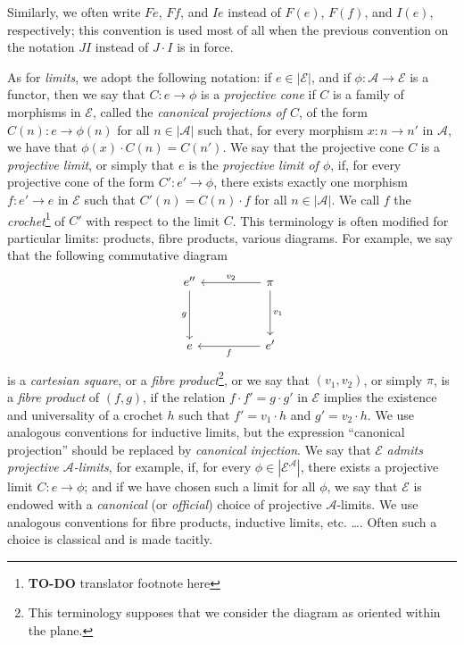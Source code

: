\documentclass[fleqn]{article}
\newcommand{\oldpage}[1]{\marginpar{\footnotesize$\Big\vert$ \textit{p.~#1}}}
\newcommand{\todo}{{\color{purple}\textbf{TO-DO }}}
\newcommand{\cat}[1]{\mathcal{#1}}
\newcommand{\set}[1]{|#1|}
\begin{document}
Similarly, we often write $Fe$, $Ff$, and $Ie$ instead of $F(e)$, $F(f)$, and $I(e)$, respectively; this convention is used most of all when the previous convention on the notation $JI$ instead of $J\cdot I$ is in force.

As for \emph{limits}, we adopt the following notation: if $e\in\set{\cat{E}}$, and if $\phi\colon \cat{A}\to\cat{E}$ is a functor, then we say that $C\colon e\to\phi$ is a \emph{projective cone} if $C$ is a family of morphisms in $\cat{E}$, called the \emph{canonical projections of $C$}, of the form $C(n)\colon e\to\phi(n)$ for all $n\in\set{\cat{A}}$ such that, for every morphism $x\colon n\to n'$ in $\cat{A}$, we have that $\phi(x)\cdot C(n)=C(n')$.
We say that the projective cone $C$ is a \emph{projective limit}, or simply that $e$ is the \emph{projective limit of $\phi$}, if, for every projective cone of the form $C'\colon e'\to\phi$, there exists exactly one morphism $f\colon e'\to e$ in $\cat{E}$ such that $C'(n)=C(n)\cdot f$ for all $n\in\set{\cat{A}}$.
We call $f$ the \emph{crochet}\footnote{\todo{translator footnote here}} of $C'$ with respect to the limit $C$.
This terminology is often modified for particular limits: products, fibre products, various diagrams.
For example, we say that the following commutative diagram
\oldpage{222}
\[
  \begin{tikzcd}[sep=huge]
    e'' \ar[d,swap,"g"]
  & \pi \ar[l,swap,"v_2"] \ar[d,"v_1"]
  \\e
  & e' \ar[l,"f"]
  \end{tikzcd}
\]
is a \emph{cartesian square}, or a \emph{fibre product}\footnote{This terminology supposes that we consider the diagram as oriented within the plane.}, or we say that $(v_1,v_2)$, or simply $\pi$, is a \emph{fibre product} of $(f,g)$, if the relation $f\cdot f'=g\cdot g'$ in $\cat{E}$ implies the existence and universality of a crochet $h$ such that $f'=v_1\cdot h$ and $g'=v_2\cdot h$.
We use analogous conventions for inductive limits, but the expression ``canonical projection''  should be replaced by \emph{canonical injection}.
We say that $\cat{E}$ \emph{admits projective $\cat{A}$-limits}, for example, if, for every $\phi\in\set{\cat{E}^\cat{A}}$, there exists a projective limit $C\colon e\to\phi$;
and if we have chosen such a limit for all $\phi$, we say that $\cat{E}$ is endowed with a \emph{canonical} (or \emph{official}) choice of projective $\cat{A}$-limits.
We use analogous conventions for fibre products, inductive limits, etc. \ldots.
Often such a choice is classical and is made tacitly.
\end{document}
